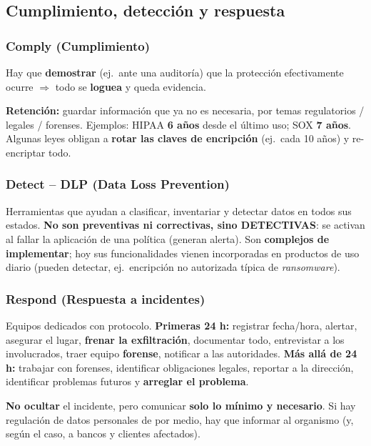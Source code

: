 \documentclass[../main.tex]{subfiles}
\begin{document}
\subsection{Cumplimiento, detección y respuesta}

\subsubsection{Comply (Cumplimiento)}
Hay que \textbf{demostrar} (ej.\ ante una auditoría) que la protección efectivamente
ocurre $\Rightarrow$ todo se \textbf{loguea} y queda evidencia.

\textbf{Retención:} guardar información que ya no es necesaria, por temas regulatorios /
legales / forenses. Ejemplos: HIPAA \textbf{6 años} desde el último uso; SOX \textbf{7
años}. Algunas leyes obligan a \textbf{rotar las claves de encripción} (ej.\ cada 10
años) y re-encriptar todo.

\subsubsection{Detect -- DLP (Data Loss Prevention)}
Herramientas que ayudan a clasificar, inventariar y detectar datos en todos sus estados.
\textbf{No son preventivas ni correctivas, sino DETECTIVAS}: se activan al fallar la
aplicación de una política (generan alerta). Son \textbf{complejos de implementar}; hoy
sus funcionalidades vienen incorporadas en productos de uso diario (pueden detectar,
ej.\ encripción no autorizada típica de \emph{ransomware}).

\subsubsection{Respond (Respuesta a incidentes)}
Equipos dedicados con protocolo. \textbf{Primeras 24 h:} registrar fecha/hora, alertar,
asegurar el lugar, \textbf{frenar la exfiltración}, documentar todo, entrevistar a los
involucrados, traer equipo \textbf{forense}, notificar a las autoridades. \textbf{Más
allá de 24 h:} trabajar con forenses, identificar obligaciones legales, reportar a la
dirección, identificar problemas futuros y \textbf{arreglar el problema}.
\begin{destacado}
\textbf{No ocultar} el incidente, pero comunicar \textbf{solo lo mínimo y necesario}.
Si hay regulación de datos personales de por medio, hay que informar al organismo (y,
según el caso, a bancos y clientes afectados).
\end{destacado}
\end{document}
